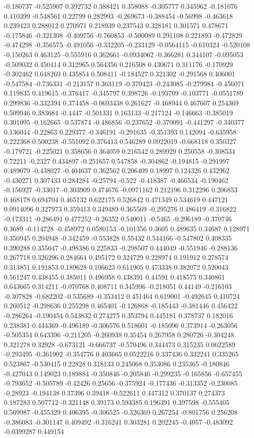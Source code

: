 -0.180737 -0.525907 0.392732 0.388421 0.358088 -0.305777 0.345962 -0.181076 0.410399 -0.548561 0.22799 0.282993 -0.269673 -0.388454 -0.56998 -0.463618 0.239423 0.288012 0.270971 0.218939 0.237543 0.328181 0.301571 0.478671 -0.175846 -0.321308 -0.409756 -0.760853 -0.500089 0.291108 0.221893 -0.472829 -0.474298 -0.356575 -0.491056 -0.332205 -0.233129 -0.0564115 -0.610324 -0.520108 -0.150263 0.463125 -0.555916 0.362661 -0.0934062 -0.366281 0.344107 -0.095053 -0.509032 0.450414 0.312965 0.564356 0.216508 0.430671 0.311176 -0.170929 -0.302462 0.648269 0.435854 0.508411 -0.184527 0.321302 -0.291568 0.406001 -0.547584 -0.736331 -0.213157 0.363119 -0.370423 -0.243085 -0.279984 -0.456071 0.119835 0.419615 -0.376417 -0.345797 0.398726 -0.193709 -0.103771 -0.0551789 0.299836 -0.332394 0.374458 -0.0693438 0.261627 -0.468944 0.467607 0.254369 0.509946 0.383684 -0.4447 -0.501331 0.163133 -0.217124 -0.146663 -0.385019 0.301095 -0.162665 -0.537874 -0.486856 -0.237652 -0.370091 -0.441297 -0.340377 0.136044 -0.22863 0.229377 -0.346191 -0.291635 -0.351393 0.142094 -0.635958 0.222368 0.500238 -0.551092 0.376413 0.546289 0.0922019 -0.668118 0.350327 -0.179721 -0.225021 0.358656 0.364059 0.216542 0.289929 0.250558 -0.308534 0.72211 -0.2327 0.434897 -0.251657 0.547858 -0.304862 -0.194815 -0.291997 0.489079 -0.438027 -0.404637 0.362562 0.206409 0.18997 0.124326 0.432962 -0.430271 0.307433 0.284284 -0.25794 -0.522 -0.418387 -0.466534 -0.190462 -0.156927 -0.33017 -0.303909 0.474676 -0.0971162 0.212196 0.312296 0.206853 0.468178 0.694704 0.465132 0.622175 0.526842 0.471349 0.534619 0.447121 0.0914096 0.327973 0.359413 0.349489 0.365569 -0.295276 0.486419 -0.316822 -0.173311 -0.286491 0.477252 -0.26352 0.540011 -0.5465 -0.296189 -0.370746 0.3689 -0.114728 -0.458972 0.0580153 -0.101356 0.3605 0.489635 0.34687 0.128971 0.350945 0.204948 -0.342459 -0.553828 0.55432 0.544166 -0.547802 0.408335 0.390288 0.355047 -0.498386 0.225833 -0.298507 0.444049 -0.551946 -0.288136 0.267718 0.326296 0.284664 0.495172 0.324729 0.228974 0.191912 0.278574 0.313851 0.191853 0.189628 0.106623 0.611905 0.473338 0.382072 0.520043 0.561247 0.438455 0.385011 0.496958 0.438391 0.44591 0.418575 0.340861 0.643665 0.314211 -0.070768 0.408711 0.345996 -0.218051 0.44149 -0.216103 -0.307828 -0.682202 -0.535689 -0.353412 0.451464 0.619001 -0.492645 0.410724 0.260512 -0.298636 0.255298 0.465401 -0.126868 -0.185443 -0.381446 0.456422 -0.286264 -0.190454 0.543832 0.274275 0.353794 0.445181 0.378737 0.182016 0.238381 0.444369 -0.496189 -0.306576 0.518601 -0.185096 0.373914 -0.263056 -0.505354 0.643396 -0.211205 -0.260938 0.35454 0.267958 0.280726 -0.304248 0.321278 0.32928 -0.673121 -0.666737 -0.570496 0.344473 0.315235 0.0622589 -0.293495 -0.361902 -0.354776 0.403665 0.0522216 0.337436 0.332241 0.335265 0.523867 -0.530415 0.22828 0.318133 0.245068 0.353086 0.235365 -0.180846 -0.427043 0.149023 0.189884 -0.350846 -0.205846 -0.299235 -0.165856 -0.657455 -0.793652 -0.505789 -0.42426 0.25656 -0.375924 -0.177436 -0.313352 -0.230085 -0.28923 -0.194138 0.37396 0.39418 -0.522611 0.447312 0.370137 0.274373 0.187283 0.507712 -0.321148 0.39173 0.593385 0.196391 0.397598 -0.555405 0.509987 -0.455329 0.406395 -0.306525 -0.326369 0.267254 -0.801756 0.256208 -0.386083 -0.301147 0.409492 -0.316241 0.303281 0.202245 -0.4057 -0.483092 -0.0399287 0.449154 